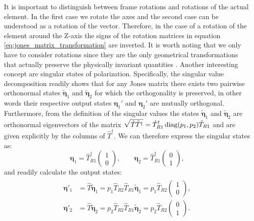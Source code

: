 It is important to distinguish between frame rotations and rotations of the actual element. In the first case we rotate the axes and the second case can be understood as a rotation of the vector. Therefore, in the case of a rotation of the element around the Z-axis the signs of the rotation matrices in equation \ref{eq:jones_matrix_transformation} are inverted. It is worth noting that we only have to consider rotations since they are the only geometrical transformations that actually preserve the physically invariant quantities \cite{GilPerez2017PolarizedApproach}. Another interesting concept are singular states of polarization. Specifically, the singular value decomposition readily shows that for any Jones matrix there exists two pairwise orthonormal states $\tilde{\bm{\eta}}_1$ and $\tilde{\bm{\eta}}_2$ for which the orthogonality is preserved, in other words their respective output states $\bm{\eta}_1'$ and $\bm{\eta}_2'$ are mutually orthogonal. Furthermore, from the definition of the singular values the states $\tilde{\bm{\eta}}_1$ and $\tilde{\bm{\eta}}_2$ are orthonormal eigenvectors of the matrix $\sqrt{\hat{T}\hat{T}^{\dagger}}=\hat{T}_{R1}^{\dagger}\operatorname{diag}(p_1, p_2)\hat{T}_{R1}$ and are given explicitly by the columns of $\hat{T}^{\dagger}$. We can therefore express the singular states as:
\begin{equation}
    \bm{\eta}_1 = \hat{T}^{\dagger}_{R1}\begin{pmatrix} 1 \\ 0 \end{pmatrix}, \qquad
    \bm{\eta}_2 = \hat{T}^{\dagger}_{R1}\begin{pmatrix} 0 \\ 1 \end{pmatrix},
\end{equation}
and readily calculate the output states:
\begin{align}
\begin{split}
    \bm{\eta}'_1 &= \hat{T}\tilde{\bm{\eta}}_1 = 
    p_1\hat{T}_{R2}\hat{T}_{R1}\tilde{\bm{\eta}}_1 =
    p_1\hat{T}_{R2}\begin{pmatrix} 1 \\ 0 \end{pmatrix}, \\
    \bm{\eta}'_2 &= \hat{T}\tilde{\bm{\eta}}_2 = 
    p_2\hat{T}_{R2}\hat{T}_{R1}\tilde{\bm{\eta}}_2 =
    p_2\hat{T}_{R2}\begin{pmatrix} 0 \\ 1 \end{pmatrix}.
\end{split}
\end{align}
